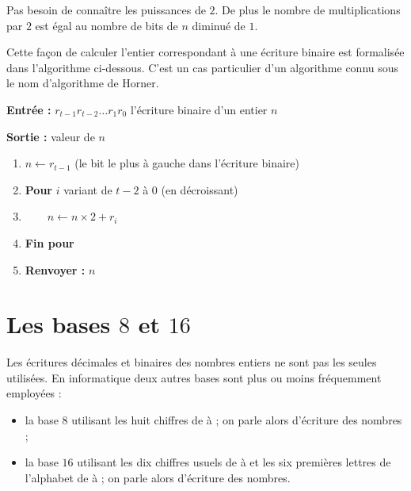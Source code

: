 \documentclass[class=report,crop=false]{standalone}
\begin{document}
Pas besoin de connaître les puissances de $2$. De plus le nombre de
multiplications par $2$ est égal au nombre de bits de $n$ diminué de $1$.

Cette façon de calculer l'entier correspondant à une écriture binaire
est formalisée dans l'algorithme ci-dessous. C'est
un cas particulier d'un algorithme connu sous le nom d'algorithme de Horner.

\begin{algo}

\textbf{Entrée :} $r_{t-1}r_{t-2}\ldots r_1r_0$ l'écriture binaire d'un entier $n$

\textbf{Sortie :} valeur de $n$

\begin{enumerate}

\item $n\leftarrow r_{t-1}$ (le bit le plus à gauche dans l'écriture binaire)
\item \textbf{Pour} $i$ variant de $t-2$ à 0 (en décroissant)
\item $\qquad n\leftarrow n\times 2 + r_{i}$
\item \textbf{Fin pour}
\item \textbf{Renvoyer :} $n$
\end{enumerate}
\end{algo}


\section{Les bases $8$ et $16$}


Les écritures décimales et binaires des nombres entiers ne sont pas les
seules utilisées. En informatique deux autres bases sont plus ou moins
fréquemment employées :
\begin{itemize}
\item la base $8$ utilisant les huit chiffres de  à  ; on
  parle alors d'écriture  des nombres ;
\item la base $16$ utilisant les dix chiffres usuels de  à
   et les six premières lettres de l'alphabet de  à
   ; on parle alors d'écriture  des
  nombres.
\end{itemize}

\end{document}
